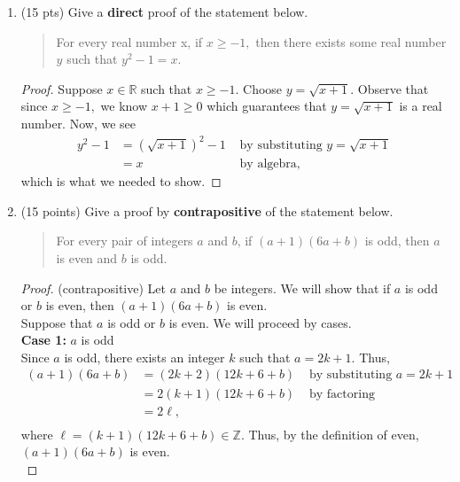 \documentclass[11pt]{article}
\newcommand{\R}{{\mathbb{R}}}
\newcommand{\Z}{{\mathbb{Z}}}
\begin{document}
\thispagestyle{fancy}


\begin{enumerate}

\item (15 pts) Give a \textbf{direct} proof of the statement below.
\begin{quote} For every real number x, if $x \geq -1,$ then there exists some real number $y$ such that $y^2-1=x.$ \end{quote}

\begin{proof} Suppose $x \in \R$ such that $x \geq -1.$ Choose $y=\sqrt{x+1}.$ Observe that since $x \geq -1,$ we know $x+1 \geq 0$ which guarantees that $y=\sqrt{x+1}$ is a real number. Now, we see
\begin{align*}
y^2-1& = (  \sqrt{x+1} )^2 -1& \text{ by substituting } y=\sqrt{x+1}\\
&=x& \text{ by algebra,}
\end{align*}
which is what we needed to show.
\end{proof}

\item (15 points) Give a proof by \textbf{contrapositive} of the statement below.

\begin{quote} For every pair of integers $a$ and $b$, if $(a+1)(6a+b)$ is odd, then $a$ is even and $b$ is odd. \end{quote}

\begin{proof} (contrapositive) Let $a$ and $b$ be integers. We will show that if $a$ is odd or $b$ is even, then $(a+1)(6a+b)$ is even. \\

Suppose that $a$ is odd or $b$ is even. We will proceed by cases.\\

\textbf{Case 1:} $a$ is odd\\
Since $a$ is odd, there exists an integer $k$ such that $a=2k+1.$ Thus, 
\begin{align*}
(a+1)(6a+b)& = (2k+2)(12k+6+b)& \text{ by substituting } a=2k+1\\
&=2(k+1)(12k+6+b)& \text{ by factoring}\\
&=2\ell,&\\
\end{align*}
where $\ell=(k+1)(12k+6+b) \in \Z.$ Thus, by the definition of even, $(a+1)(6a+b)$ is even.\\


\end{proof}
\end{enumerate}
\end{document}
